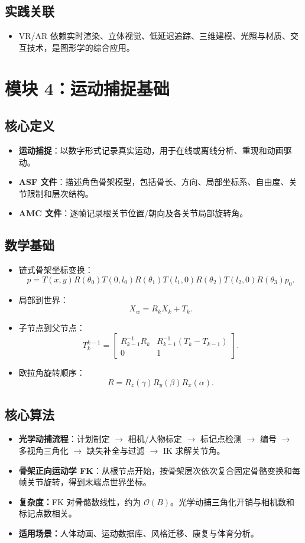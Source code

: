 \documentclass[UTF8,zihao=-4,scheme=chinese,fontset=fandol]{ctexart}
\newcommand{\key}[1]{\textbf{#1}}
\newcommand{\complexity}[1]{\textbf{复杂度：}#1}
\newcommand{\scene}[1]{\textbf{适用场景：}#1}
\begin{document}
\subsection{实践关联}
\begin{itemize}
  \item VR/AR 依赖实时渲染、立体视觉、低延迟追踪、三维建模、光照与材质、交互技术，是图形学的综合应用。
\end{itemize}

\section{模块 4：运动捕捉基础}

\subsection{核心定义}
\begin{itemize}
  \item \key{运动捕捉}：以数字形式记录真实运动，用于在线或离线分析、重现和动画驱动。
  \item \key{ASF 文件}：描述角色骨架模型，包括骨长、方向、局部坐标系、自由度、关节限制和层次结构。
  \item \key{AMC 文件}：逐帧记录根关节位置/朝向及各关节局部旋转角。
\end{itemize}

\subsection{数学基础}
\begin{itemize}
  \item 链式骨架坐标变换：
  \[
  p=T(x,y)R(\theta_0)T(0,l_0)R(\theta_1)T(l_1,0)R(\theta_2)T(l_2,0)R(\theta_3)p_0.
  \]
  \item 局部到世界：
  \[
  X_w=R_kX_k+T_k.
  \]
  \item 子节点到父节点：
  \[
  T_k^{k-1}=
  \begin{bmatrix}
  R_{k-1}^{-1}R_k & R_{k-1}^{-1}(T_k-T_{k-1})\\
  0&1
  \end{bmatrix}.
  \]
  \item 欧拉角旋转顺序：
  \[
  R=R_z(\gamma)R_y(\beta)R_x(\alpha).
  \]
\end{itemize}

\subsection{核心算法}
\begin{itemize}
  \item \key{光学动捕流程}：计划制定 $\rightarrow$ 相机/人物标定 $\rightarrow$ 标记点检测 $\rightarrow$ 编号 $\rightarrow$ 多视角三角化 $\rightarrow$ 缺失补全与过滤 $\rightarrow$ IK 求解关节角。
  \item \key{骨架正向运动学 FK}：从根节点开始，按骨架层次依次复合固定骨骼变换和每帧关节旋转，得到末端点世界坐标。
  \item \complexity{FK 对骨骼数线性，约为 $\mathcal O(B)$。光学动捕三角化开销与相机数和标记点数相关。}
  \item \scene{人体动画、运动数据库、风格迁移、康复与体育分析。}
\end{itemize}
\end{document}
